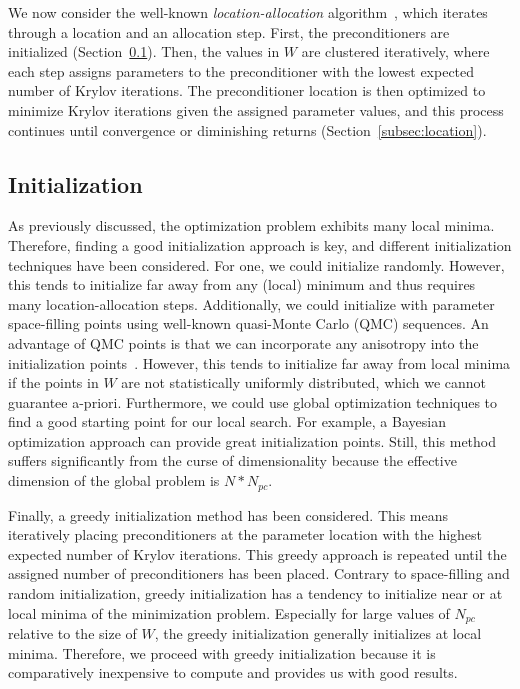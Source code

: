 We now consider the well-known \emph{location-allocation} algorithm~\cite{cooper1963,lara2018}, which iterates through a location and an allocation step.
First, the preconditioners are initialized (Section~\ref{subsec:initialization}).
Then, the values in $W$ are clustered iteratively, where each step assigns parameters to the preconditioner with the lowest expected number of Krylov iterations.
The preconditioner location is then optimized to minimize Krylov iterations given the assigned parameter values, and this process continues until convergence or diminishing returns (Section~\ref{subsec:location}).

\subsection{Initialization}\label{subsec:initialization}
As previously discussed, the optimization problem exhibits many local minima.
Therefore, finding a good initialization approach is key, and different initialization techniques have been considered.
For one, we could initialize randomly.
However, this tends to initialize far away from any (local) minimum and thus requires many location-allocation steps.
Additionally, we could initialize with parameter space-filling points using well-known quasi-Monte Carlo (QMC) sequences.
An advantage of QMC points is that we can incorporate any anisotropy into the initialization points~\cite{howell2009}.
However, this tends to initialize far away from local minima if the points in $W$ are not statistically uniformly distributed, which we cannot guarantee a-priori.
Furthermore, we could use global optimization techniques to find a good starting point for our local search.
For example, a Bayesian optimization approach can provide great initialization points.
Still, this method suffers significantly from the curse of dimensionality because the effective dimension of the global problem is $N*N_{pc}$.

Finally, a greedy initialization method has been considered.
This means iteratively placing preconditioners at the parameter location with the highest expected number of Krylov iterations.
This greedy approach is repeated until the assigned number of preconditioners has been placed.
Contrary to space-filling and random initialization, greedy initialization has a tendency to initialize near or at local minima of the minimization problem.
Especially for large values of $N_{pc}$ relative to the size of $W$, the greedy initialization generally initializes at local minima.
Therefore, we proceed with greedy initialization because it is comparatively inexpensive to compute and provides us with good results.

